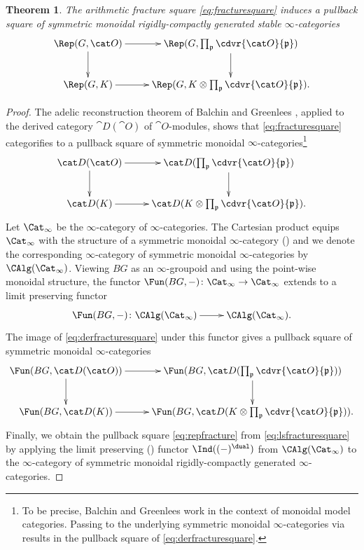 \documentclass{amsart}%
\numberwithin{equation}{section}%
\newtheorem{Thm}[equation]{Theorem}
\theoremstyle{remark}
\begin{document}
\begin{Thm}\label{thm:arithmeticrepltg}
The arithmetic fracture square \eqref{eq:fracturesquare} induces a pullback square of symmetric monoidal rigidly-compactly generated stable $\infty$-categories
\begin{equation}\label{eq:repfracture}
    \vcenter{
        \xymatrix{\Rep(G,\cat O) \ar[r] \ar[d] & \Rep(G,\prod_{\frak p}\cdvr{\cat O}{\frak p}) \ar[d] \\
        \Rep(G,K) \ar[r] & \Rep(G,K \otimes \prod_{\frak p}\cdvr{\cat O}{\frak p}).}
    }
\end{equation}
\end{Thm}
\begin{proof}
The adelic reconstruction theorem of Balchin and Greenlees \cite{balchingreenlees_adelic1}, applied to the derived category $\cat D(\cat O)$ of $\cat O$-modules, shows that \eqref{eq:fracturesquare} categorifies to a pullback square of symmetric monoidal $\infty$-categories\footnote{To be precise, Balchin and Greenlees work in the context of monoidal model categories. Passing to the underlying symmetric monoidal $\infty$-categories via \cite[\S4.1.7]{HALurie} results in the pullback square of \eqref{eq:derfracturesquare}.}
\begin{equation}\label{eq:derfracturesquare}
    \vcenter{
        \xymatrix{\cat D(\cat O) \ar[r] \ar[d] & \cat D(\prod_{\frak p}\cdvr{\cat O}{\frak p}) \ar[d] \\
        \cat D(K) \ar[r] & \cat D(K\otimes\prod_{\frak p}\cdvr{\cat O}{\frak p}).}
    }
\end{equation}
Let $\Cat_{\infty}$ be the $\infty$-category of $\infty$-categories. The Cartesian product equips $\Cat_{\infty}$ with the structure of a symmetric monoidal $\infty$-category (\cite[\S2.4.1]{HALurie}) and we denote the corresponding $\infty$-category of symmetric monoidal $\infty$-categories by $\CAlg(\Cat_{\infty})$. Viewing $BG$ as an $\infty$-groupoid and using the point-wise monoidal structure, the functor $\Fun(BG,-)\colon \Cat_{\infty} \to \Cat_{\infty}$ extends to a limit preserving functor
\[
\xymatrix{\Fun(BG,-)\colon \CAlg(\Cat_{\infty}) \ar[r] & \CAlg(\Cat_{\infty}).}
\]
The image of \eqref{eq:derfracturesquare} under this functor gives a pullback square of symmetric monoidal $\infty$-categories
\begin{equation}\label{eq:lsfracturesquare}
    \vcenter{
        \xymatrix{\Fun(BG,\cat D(\cat O)) \ar[r] \ar[d] & \Fun(BG,\cat D(\prod_{\frak p}\cdvr{\cat O}{\frak p})) \ar[d] \\
        \Fun(BG,\cat D(K)) \ar[r] & \Fun(BG,\cat D(K\otimes\prod_{\frak p}\cdvr{\cat O}{\frak p})).}
    }
\end{equation}
Finally, we obtain the pullback square \eqref{eq:repfracture} from \eqref{eq:lsfracturesquare} by applying the limit preserving (\cite[Prop.~4.6.1.11]{HALurie}) functor $\Ind((-)^{\dual})$ from $\CAlg(\Cat_{\infty})$ to the $\infty$-category of symmetric monoidal rigidly-compactly generated $\infty$-categories. 
\end{proof}
\end{document}

